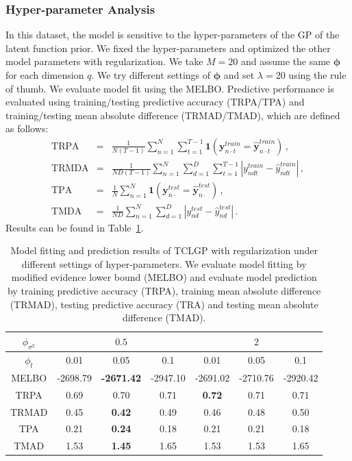 \documentclass{article}
\begin{document}
\subsubsection{Hyper-parameter Analysis}
In this dataset, the model is sensitive to the hyper-parameters of the GP of the latent function prior. We fixed the hyper-parameters and optimized the other model parameters with regularization. We take $M = 20$ and assume the same $\bm \phi$ for each dimension $q$. We try different settings of $\bm \phi$ and set $\lambda =20$ using  the rule of thumb. We evaluate model fit using the MELBO. Predictive performance is evaluated using training/testing predictive accuracy (TRPA/TPA) and training/testing mean absolute difference (TRMAD/TMAD), which are defined as follows:
\footnotesize{
\begin{eqnarray}
\mathrm{TRPA} & = & \frac{1}{N(T-1)}\sum_{n = 1}^{N}\sum_{t = 1}^{T-1}\bm 1(\bm y^{train}_{n\cdot t} = \hat{\bm y}^{train}_{n\cdot t}) \,, \nonumber \\
\mathrm{TRMDA} & = & \frac{1}{ND(T-1)}\sum_{n = 1}^{N}\sum_{d = 1}^{D}\sum_{t=1}^{T-1}|y^{train}_{ndt}-\hat{y}^{train}_{ndt}| \,, \nonumber \\
\mathrm{TPA} & = & \frac{1}{N}\sum_{n = 1}^{N}\bm 1(\bm y^{test}_{n\cdot} = \hat{\bm y}^{test}_{n\cdot}) \,, \nonumber \\
\mathrm{TMDA} & = & \frac{1}{ND}\sum_{n = 1}^{N}\sum_{d = 1}^{D}|y^{test}_{nd}-\hat{y}^{test}_{nd}| \,. \nonumber
\end{eqnarray} 
}
%
Results can be found in Table~\ref{tab:STOCK}.

\begin{table}[ht!]
	\centering
	\begin{tabular}{|c|c|c|c|c|c|c|}
		\hline
		$\phi_{\sigma^2}$ & \multicolumn{3}{|c|}{$0.5$} & \multicolumn{3}{|c|}{$2$} \\
		\hline
		$\phi_l$ & 0.01 & 0.05 & 0.1 & 0.01 & 0.05 & 0.1  \\
		\hline
		MELBO & -2698.79 & \textbf{-2671.42} & -2947.10 & -2691.02 & -2710.76 & -2920.42\\
		\hline
		TRPA & 0.69 & 0.70 & 0.71 & \textbf{0.72} & 0.71 & 0.71  \\
		\hline
		TRMAD & 0.45 & \textbf{0.42} & 0.49 & 0.46 & 0.48 & 0.50 \\
		\hline
		TPA  & 0.21 & \textbf{0.24} & 0.18 & 0.21 & 0.21 & 0.18 \\
		\hline
		TMAD & 1.53 & \textbf{1.45} & 1.65 & 1.53 & 1.53 & 1.65 \\
		\hline
	\end{tabular}
    \caption{Model fitting and prediction results of TCLGP with regularization under different settings of hyper-parameters. We evaluate model fitting by modified evidence lower bound (MELBO) and evaluate model prediction by training predictive accuracy (TRPA), training mean absolute difference (TRMAD), testing predictive accuracy (TRA) and testing mean absolute difference (TMAD).}
	\label{tab:STOCK}
\end{table}
\end{document}
